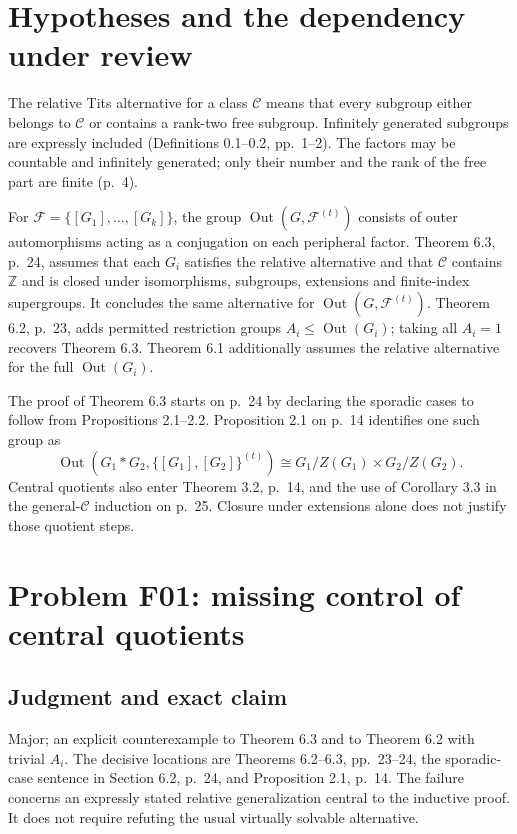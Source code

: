 \documentclass[10pt]{article}
\begin{document}
\section*{Hypotheses and the dependency under review}
The relative Tits alternative for a class \(\mathcal C\) means that every subgroup either belongs to \(\mathcal C\) or contains a rank-two free subgroup. Infinitely generated subgroups are expressly included (Definitions 0.1–0.2, pp. 1–2). The factors may be countable and infinitely generated; only their number and the rank of the free part are finite (p. 4).\par
For \(\mathcal F=\{[G_1],\ldots,[G_k]\}\), the group \(\operatorname{Out}(G,\mathcal F^{(t)})\) consists of outer automorphisms acting as a conjugation on each peripheral factor. Theorem 6.3, p. 24, assumes that each \(G_i\) satisfies the relative alternative and that \(\mathcal C\) contains \(\mathbb Z\) and is closed under isomorphisms, subgroups, extensions and finite-index supergroups. It concludes the same alternative for \(\operatorname{Out}(G,\mathcal F^{(t)})\). Theorem 6.2, p. 23, adds permitted restriction groups \(A_i\leq\operatorname{Out}(G_i)\); taking all \(A_i=1\) recovers Theorem 6.3. Theorem 6.1 additionally assumes the relative alternative for the full \(\operatorname{Out}(G_i)\).\par
The proof of Theorem 6.3 starts on p. 24 by declaring the sporadic cases to follow from Propositions 2.1–2.2. Proposition 2.1 on p. 14 identifies one such group as \[\operatorname{Out}(G_1*G_2,\{[G_1],[G_2]\}^{(t)})
\cong G_1/Z(G_1)\times G_2/Z(G_2).\] Central quotients also enter Theorem 3.2, p. 14, and the use of Corollary 3.3 in the general-\(\mathcal C\) induction on p. 25. Closure under extensions alone does not justify those quotient steps.\par
\section*{Problem F01: missing control of central quotients}
\subsection*{Judgment and exact claim}
Major; an explicit counterexample to Theorem 6.3 and to Theorem 6.2 with trivial \(A_i\). The decisive locations are Theorems 6.2–6.3, pp. 23–24, the sporadic-case sentence in Section 6.2, p. 24, and Proposition 2.1, p. 14. The failure concerns an expressly stated relative generalization central to the inductive proof. It does not require refuting the usual virtually solvable alternative.\par
\end{document}
